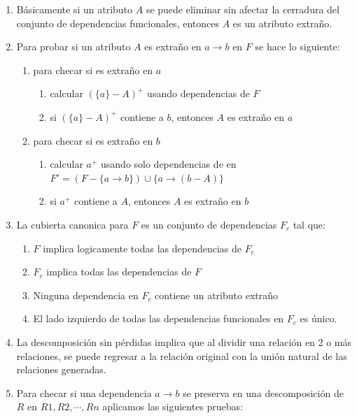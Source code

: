 \documentclass[twoside]{article}
\begin{document}
\begin{enumerate}
      \item Básicamente si un atributo $A$ se puede eliminar sin afectar la cerradura del conjunto de dependencias funcionales, entonces $A$ es un atributo extraño.
      \item Para probar si un atributo $A$ es extraño en $a \rightarrow b$ en $F$ se hace lo siguiente:
            \begin{enumerate}
                  \item para checar si es extraño en $a$
                        \begin{enumerate}
                              \item calcular $(\{a\} - A)^+$ usando dependencias de $F$
                              \item si $(\{a\} - A)^+$ contiene a $b$, entonces $A$ es extraño en $a$
                        \end{enumerate}
                  \item para checar si es extraño en $b$
                        \begin{enumerate}
                              \item calcular $a^+$ usando solo dependencias de en $F' = (F - \{a \rightarrow b\}) \cup \{a \rightarrow (b - A)\}$
                              \item si $a^+$ contiene a $A$, entonces $A$ es extraño en $b$
                        \end{enumerate}
            \end{enumerate}
      \item La cubierta canonica para $F$ es un conjunto de dependencias $F_c$ tal que:
            \begin{enumerate}
                  \item $F$ implica logicamente todas las dependencias de $F_c$
                  \item $F_c$ implica todas las dependencias de $F$
                  \item Ninguna dependencia en $F_c$ contiene un atributo extraño
                  \item El lado izquierdo de todas las dependencias funcionales en $F_c$ es único.
            \end{enumerate}
      \item La descomposición sin pérdidas implica que al dividir una relación en 2 o más relaciones, se puede regresar a la relación
            original con la unión natural de las relaciones generadas.
      \item Para checar si una dependencia $a \rightarrow b$ se preserva en una descomposición de $R$ en $R1, R2, \cdots, Rn$ aplicamos las siguientes pruebas:

\end{enumerate}
\end{document}
